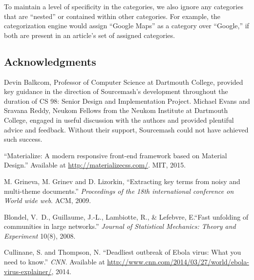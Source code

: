 \documentclass[11pt]{article}
\begin{document}
To maintain a level of specificity in the categories, we also ignore any categories that are ``nested'' or contained within other categories. For example, the categorization engine would assign ``Google Maps'' as a category over ``Google,'' if both are present in an article's set of assigned categories.



\subsection*{Acknowledgments}
Devin Balkcom, Professor of Computer Science at Dartmouth College, provided key guidance in the direction of Sourcemash's development throughout the duration of CS 98: Senior Design and Implementation Project. Michael Evans and Sravana Reddy, Neukom Fellows from the Neukom Institute at Dartmouth College, engaged in useful discussion with the authors and provided plentiful advice and feedback. Without their support, Sourcemash could not have achieved such success.


\begin{thebibliography}{99}

  ``Materialize: A modern responsive front-end framework based on Material Design.'' Available at \url{http://materializecss.com/}. MIT, 2015.

  M. Grineva, M. Grinev and D. Lizorkin, ``Extracting key terms from noisy and multi-theme documents.'' \emph{Proceedings of the 18th international conference on World wide web}. ACM, 2009.

 Blondel, V.~D., Guillaume, J.-L., Lambiotte, R., \& Lefebvre, E.``Fast unfolding of communities in large networks.'' \emph{Journal of Statistical Mechanics: Theory and Experiment} 10(8), 2008.

 Cullinane, S. and Thompson, N. ``Deadliest outbreak of Ebola virus: What you need to know.'' \emph{CNN}. Available at \url{http://www.cnn.com/2014/03/27/world/ebola-virus-explainer/}, 2014.

\end{thebibliography}
\end{document}
